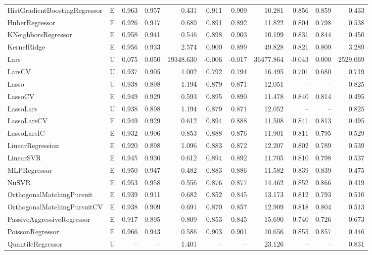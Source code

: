 \begin{table}[t!]
\begin{adjustbox}{max width=\textwidth}
\begin{tabular}{llrrrrrrrrr}
HistGradientBoostingRegressor & E & 0.963 & 0.957 & 0.431 & 0.911 & 0.909 & 10.281 & 0.856 & 0.859 & 0.433 \\
HuberRegressor & E & 0.926 & 0.917 & 0.689 & 0.891 & 0.892 & 11.822 & 0.804 & 0.798 & 0.538 \\
KNeighborsRegressor & E & 0.958 & 0.941 & 0.546 & 0.898 & 0.903 & 10.199 & 0.831 & 0.844 & 0.450 \\
KernelRidge & E & 0.956 & 0.933 & 2.574 & 0.900 & 0.899 & 49.828 & 0.821 & 0.809 & 3.289 \\
Lars & U & 0.075 & 0.050 & 19348.630 & -0.006 & -0.017 & 36477.864 & -0.043 & 0.000 & 2529.069 \\
LarsCV & U & 0.937 & 0.905 & 1.002 & 0.792 & 0.794 & 16.495 & 0.701 & 0.680 & 0.719 \\
Lasso & U & 0.938 & 0.898 & 1.194 & 0.879 & 0.871 & 12.051 & -- & -- & 0.825 \\
LassoCV & E & 0.949 & 0.929 & 0.593 & 0.895 & 0.890 & 11.478 & 0.840 & 0.814 & 0.495 \\
LassoLars & U & 0.938 & 0.898 & 1.194 & 0.879 & 0.871 & 12.052 & -- & -- & 0.825 \\
LassoLarsCV & E & 0.949 & 0.929 & 0.612 & 0.894 & 0.888 & 11.508 & 0.841 & 0.813 & 0.495 \\
LassoLarsIC & E & 0.932 & 0.906 & 0.853 & 0.888 & 0.876 & 11.901 & 0.811 & 0.795 & 0.529 \\
LinearRegression & E & 0.920 & 0.898 & 1.096 & 0.883 & 0.872 & 12.207 & 0.802 & 0.789 & 0.539 \\
LinearSVR & E & 0.945 & 0.930 & 0.612 & 0.894 & 0.892 & 11.705 & 0.810 & 0.798 & 0.537 \\
MLPRegressor & E & 0.950 & 0.947 & 0.482 & 0.883 & 0.886 & 11.582 & 0.839 & 0.839 & 0.475 \\
NuSVR & E & 0.953 & 0.958 & 0.556 & 0.876 & 0.877 & 14.462 & 0.852 & 0.866 & 0.419 \\
OrthogonalMatchingPursuit & E & 0.939 & 0.911 & 0.682 & 0.852 & 0.845 & 13.173 & 0.812 & 0.793 & 0.510 \\
OrthogonalMatchingPursuitCV & E & 0.938 & 0.909 & 0.691 & 0.870 & 0.857 & 12.909 & 0.818 & 0.804 & 0.513 \\
PassiveAggressiveRegressor & E & 0.917 & 0.895 & 0.809 & 0.853 & 0.845 & 15.690 & 0.740 & 0.726 & 0.673 \\
PoissonRegressor & E & 0.966 & 0.943 & 0.586 & 0.903 & 0.901 & 10.656 & 0.855 & 0.857 & 0.446 \\
QuantileRegressor & U & -- & -- & 1.401 & -- & -- & 23.126 & -- & -- & 0.831 \\

\end{tabular}
\end{adjustbox}
\end{table}
